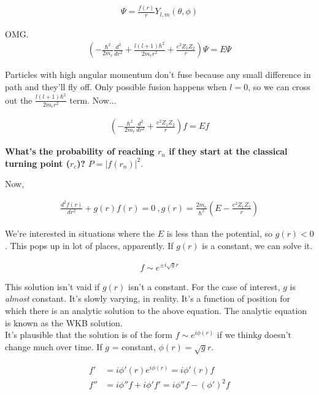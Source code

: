 \documentclass[10pt,a4paper]{article}
\begin{document}
\begin{align}
\Psi = \frac{f(r)}{r} Y_{l,m}(\theta,\phi)
\end{align}

OMG.\\

\begin{align}
\left( -\frac{\hbar^2}{2m_r} \frac{d^2}{dr^2} + \frac{l(l+1)\hbar^2}{2m_r r^2} + \frac{e^2 Z_1 Z_2}{r} \right) \Psi = E \Psi
\end{align}

Particles with high angular momentum don't fuse because any small difference in path and they'll fly off. Only possible fusion happens when $l=0$, so we can cross out the $\frac{l(l+1)\hbar^2}{2m_r r^2} $ term. Now... 

\begin{align}
\left( -\frac{\hbar^2}{2m_r} \frac{d^2}{dr^2} +  \frac{e^2 Z_1 Z_2}{r} \right) f = Ef
\end{align}

\textbf{What's the probability of reaching $r_n$ if they start at the classical turning point ($r_c$)?} $P = | f(r_n)|^2$. 

Now, 

\begin{align}
\frac{d^2 f(r)}{dr^2} + g(r)f(r) = 0~,g(r) = \frac{2m_r}{\hbar^2} \left( E - \frac{e^2 Z_1 Z_2}{r} \right)
\end{align}

We're interested in situations where the $E$ is less than the potential, so $g(r) < 0$. This pops up in  lot of places, apparently. If $g(r)$ is a constant, we can solve it. 

\begin{align}
f \sim e^{\pm i \sqrt{g} r}
\end{align}

This solution isn't vaid if $g(r)$ isn't a constant. For the case of interest, $g$ is \textit{almost} constant. It's slowly varying, in reality. It's a function of position for which there is an analytic solution to the above equation. The analytic equation is known as the WKB solution.\\

It's plausible that the solution is of the form $f \sim e^{i \phi(r)}$ if we think$g$ doesn't change much over time. If $g$ = constant, $\phi(r) = \sqrt{g} r$. 

\begin{align}
f' & = i \phi'(r)e^{i \phi(r)} = i \phi'(r)f\\
f'' & =i\phi''f + i \phi'f' = i \phi''f - (\phi')^2f
\end{align}
\end{document}
